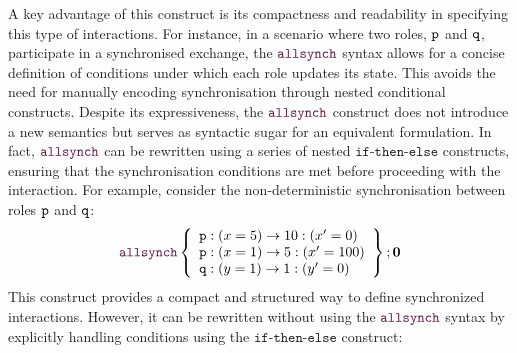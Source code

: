 \begin{itemize}
  A key advantage of this construct is its compactness and readability
  in specifying this type of interactions. For instance, in a scenario
  where two roles, $\mathtt{p}$ and $\mathtt{q}$, participate in a
  synchronised exchange, the $\allsynchName$ syntax allows for a
  concise definition of conditions under which each role updates its
  state. This avoids the need for manually encoding synchronisation
  through nested conditional constructs.
  Despite its expressiveness, the $\allsynchName$ construct does not
  introduce a new semantics but serves as syntactic sugar for an
  equivalent formulation.  In fact, $\allsynchName$ can be rewritten
  using a series of nested $\mathtt{if\text{-}then\text{-}else}$
  constructs, ensuring that the synchronisation conditions are met
  before proceeding with the interaction. For example, consider the
  non-deterministic synchronisation between roles $\mathtt{p}$ and
  $\mathtt{q}$:
  \begin{displaymath}
    \allsynchName\left\{
      \begin{array}{lll}
        \role{p} : (x=5) \rightarrow 10 : (x'=0) \\
        \role{p} : (x=1) \rightarrow 5 : (x'=100) \\
        \role{q} : (y=1) \rightarrow 1 : (y'=0)
      \end{array}
    \right\} ; \CEnd
  \end{displaymath}
  This construct provides a compact and structured way to define
  synchronized interactions. However, it can be rewritten without
  using the $\allsynchName$ syntax by explicitly handling conditions
  using the $\mathtt{if\text{-}then\text{-}else}$ construct:
  

\end{itemize}
